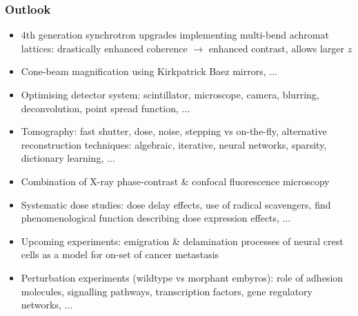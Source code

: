 \documentclass{beamer}
\begin{document}
\begin{frame}
  \frametitle{Outlook}
  \begin{itemize}
  \item 4th generation synchrotron upgrades implementing multi-bend
    achromat lattices: drastically enhanced coherence $\rightarrow$
    enhanced contrast, allows larger $z$
  \item Cone-beam magnification using Kirkpatrick Baez mirrors, ...
  \item Optimising detector system: scintillator, microscope, camera,
    blurring, deconvolution, point spread function, ...
  \item Tomography: fast shutter, dose, noise, stepping vs on-the-fly,
    alternative reconstruction techniques: algebraic, iterative,
    neural networks, sparsity, dictionary learning, ...
  \item Combination of X-ray phase-contrast \& confocal fluorescence
    microscopy
  \item Systematic dose studies: dose delay effects, use of radical
    scavengers, find phenomenological function describing dose expression
    effects, ...
  \item Upcoming experiments: emigration \& delamination processes of
    neural crest cells as a model for on-set of cancer metastasis
  \item Perturbation experiments (wildtype vs morphant embyros): role
    of adhesion molecules, signalling pathways, transcription factors,
    gene regulatory networks, ...
  \end{itemize}
\end{frame}

\end{document}
